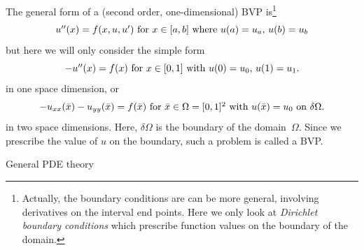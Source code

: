 The general form of a (second order, one-dimensional) \ac{BVP} is\footnote
{Actually, the boundary conditions are can be more general, involving 
derivatives on the interval end points. Here we only look at
\emph{Dirichlet boundary conditions} which prescribe function values on the boundary of the domain.}
\[ \hbox{$u''(x)=f(x,u,u')$ for $x\in[a,b]$ where $u(a)=u_a$,
  $u(b)=u_b$} \]
but here we will only consider the simple form
\begin{equation}
 \hbox{$-u''(x)=f(x)$ for $x\in[0,1]$ with $u(0)=u_0$, $u(1)=u_1$.}
 \label{eq:2nd-order-bvp}
 \end{equation}
in one space dimension, or
\begin{equation}
 \hbox{$-u_{xx}(\bar x)-u_{yy}(\bar x)=f(\bar x)$ for
   $\bar x\in\Omega=[0,1]^2$ 
    with $u(\bar x)=u_0$ on $\delta\Omega$.}
 \label{eq:2nd-order-bvp-2D}
 \end{equation}
in two space dimensions. Here, $\delta\Omega$ is the boundary of the
domain~$\Omega$. Since we prescribe the value of $u$ on the boundary,
such a problem is called a \acf{BVP}.

 {General PDE theory}
\label{sec:region-influence}

